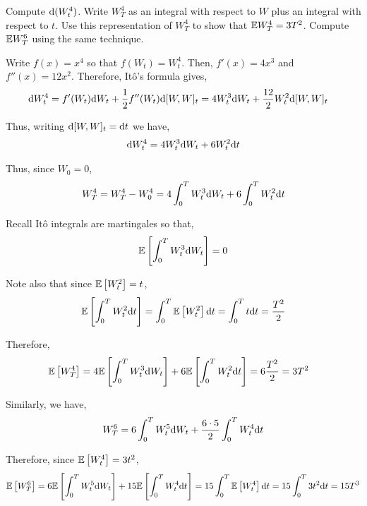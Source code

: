 \begin{problem}[Exercise 8.1]
    Compute \( \mathrm{d}(W_t^4) \). Write \( W_T^4 \) as an integral with respect to \( W \) plus an integral with respect to \( t \). Use this representation of \( W_T^4 \) to show that \( \mathbb{E} W_T^4 = 3T^2 \). Compute \( \mathbb{E} W_T^6 \) using the same technique.
\end{problem}

\begin{solution}[Solution]
Write \( f(x) = x^4 \) so that \( f(W_t) = W_t^4 \). Then, \( f'(x) = 4x^3 \) and \( f''(x) = 12x^2 \). Therefore, It\^o's formula gives,
\begin{align*}
    \mathrm{d} W_t^4 &= f'(W_t)\mathrm{d} W_t + \frac{1}{2}f''(W_t) \mathrm{d}[W,W]_t 
    = 4W_t^3 \mathrm{d} W_t + \frac{12}{2} W_t^2 \mathrm{d}[W,W]_t 
\end{align*}

Thus, writing \( \mathrm{d}[W,W]_t = \mathrm{d} t \) we have,
\begin{align*}
    \mathrm{d} W_t^4 = 4W_t^3 \mathrm{d} W_t + 6W_t^2 \mathrm{d} t
\end{align*}
    
Thus, since \( W_0 = 0 \),
\begin{align*}
    W_T^4 = W_T^4 - W_0^4 = 4\int_{0}^{T} W_t^3\mathrm{d} W_t + 6 \int_{0}^{T}W_t^2 \mathrm{d} t
\end{align*}

Recall It\^o integrals are martingales so that,
\begin{align*}
    \mathbb{E} \left[ \int_{0}^{T}W_t^3\mathrm{d} W_t \right] = 0
\end{align*}

Note also that since \( \mathbb{E} \left[ W_t^2 \right] = t \),
\begin{align*}
    \mathbb{E} \left[ \int_{0}^{T}W_t^2 \mathrm{d} t \right] = \int_{0}^{T}\mathbb{E} \left[ W_t^2 \right]\mathrm{d} t = \int_{0}^{T} t \mathrm{d} t = \dfrac{T^2}{2}
\end{align*}

Therefore,
\begin{align*}
    \mathbb{E} \left[ W_T^4 \right] &= 4\mathbb{E} \left[ \int_{0}^{T}W_t^3 \mathrm{d} W_t \right] + 6 \mathbb{E} \left[ \int_{0}^{T}W_t^2 \mathrm{d} t \right] = 6\dfrac{T^2}{2} = 3 T^2
\end{align*}

Similarly, we have,
\begin{align*}
    W_T^6 = 6\int_{0}^{T} W_t^5 \mathrm{d} W_t + \dfrac{6\cdot 5}{2}\int_{0}^{T} W_t^4 \mathrm{d} t 
\end{align*}

Therefore, since \( \mathbb{E} \left[ W_t^4 \right] = 3t^2 \),
\begin{align*}
    \mathbb{E}\left[W_T^6\right] = 6 \mathbb{E}\left[\int_{0}^{T} W_t^5 \mathrm{d} W_t\right] + 15 \mathbb{E}\left[\int_{0}^{T} W_t^4 \mathrm{d} t \right] = 15 \int_{0}^{T} \mathbb{E} \left[ W_t^4 \right] \mathrm{d} t = 15 \int_{0}^{T} 3t^2 \mathrm{d} t = 15T^3 
\end{align*}
\end{solution}

